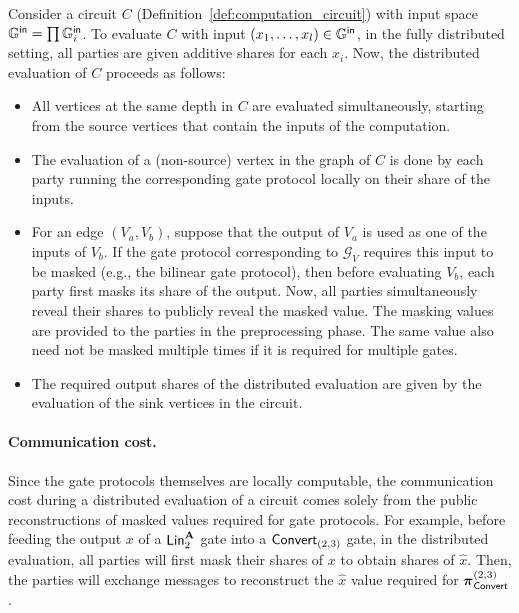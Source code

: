 Consider a circuit $C$ (Definition~\ref{def:computation_circuit}) with input space $\mathbb{G}^{\textsf{in}} = \prod \mathbb{G}^{\textsf{in}}_i$. To evaluate $C$ with input $(x_1, \dots, x_l) \in \mathbb{G}^{\textsf{in}}$, in the fully distributed setting, all parties are given additive shares for each $x_i$. Now, the distributed evaluation of $C$ proceeds as follows:
\begin{itemize}
  
  \item All vertices at the same depth in $C$ are evaluated simultaneously, starting from the source vertices that contain the inputs of the computation. 

  \item The evaluation of a (non-source) vertex in the graph of $C$ is done by each party running the corresponding gate protocol locally on their share of the inputs. 

  \item For an edge $(V_a, V_b)$, suppose that the output of $V_a$ is used as one of the inputs of $V_b$. If the gate protocol corresponding to $\mathcal{G}_V$ requires this input to be masked (e.g., the bilinear gate protocol), then before evaluating $V_b$, each party first masks its share of the output. Now, all parties simultaneously reveal their shares to publicly reveal the masked value.   The masking values are provided to the parties in the preprocessing phase. The same value also need not be masked multiple times if it is required for multiple gates.

  \item The required output shares of the distributed evaluation are given by the evaluation of the sink vertices in the circuit.
\end{itemize}

\paragraph{Communication cost.}
Since the gate protocols themselves are locally computable, the communication cost during a distributed evaluation of a circuit comes solely from the public reconstructions of masked values required for gate protocols. For example, before feeding the output $x$ of a $\LMap^{\mat{A}}_2$ gate into a $\textsf{Convert}_{(2,3)}$ gate, in the distributed evaluation, all parties will first mask their shares of $x$ to obtain shares of $\hat{x}$. Then, the parties will exchange messages to reconstruct the $\hat{x}$ value required for $\boldsymbol{\pi}_{\textsf{Convert}}^{(2,3)}$.

